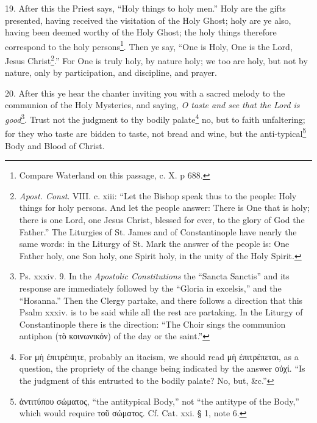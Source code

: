 19. After this the Priest says, “Holy things to holy men.” Holy are the gifts presented, having received the visitation of the Holy Ghost; holy are ye also, having been deemed worthy of the Holy Ghost; the holy things therefore correspond to the holy persons\footnote{Compare Waterland on this passage, c. X. p 688.}. Then ye say, “One is Holy, One is the Lord, Jesus Christ\footnote{\emph{Apost. Const}. VIII. c. xiii: “Let the Bishop speak thus to the people: Holy things for holy persons. And let the people answer: There is One that is holy; there is one Lord, one Jesus Christ, blessed for ever, to the glory of God the Father.” The Liturgies of St. James and of Constantinople have nearly the same words: in the Liturgy of St. Mark the answer of the people is: One Father holy, one Son holy, one Spirit holy, in the unity of the Holy Spirit.}.” For One is truly holy, by nature holy; we too are holy, but not by nature, only by participation, and discipline, and prayer.

20. After this ye hear the chanter inviting you with a sacred melody to the communion of the Holy Mysteries, and saying, \emph{O taste and see that the Lord is good}\footnote{Ps. xxxiv. 9. In the \emph{Apostolic Constitutions} the “Sancta Sanctis” and its response are immediately followed by the “Gloria in excelsis,” and the “Hosanna.” Then the Clergy partake, and there follows a direction that this Psalm xxxiv. is to be said while all the rest are partaking. In the Liturgy of Constantinople there is the direction: “The Choir sings the communion antiphon (\textgreek{τὸ κοινωνικόν}) of the day or the saint.”}. Trust not the judgment to thy bodily palate\footnote{For \textgreek{μὴ ἐπιτρέπητε}, probably an itacism, we should read \textgreek{μὴ ἐπιτρέπεται}, as a question, the propriety of the change being indicated by the answer \textgreek{οὐχί}. “Is the judgment of this entrusted to the bodily palate? No, but, \&c.”} no, but to faith unfaltering; for they who taste are bidden to taste, not bread and wine, but the anti-typical\footnote{\textgreek{ἀντιτύπου σώματος}, “the antitypical Body,” not “the antitype of the Body,” which would require \textgreek{τοῦ σώματος}. Cf. Cat. xxi. § 1, note 6.} Body and Blood of Christ.

